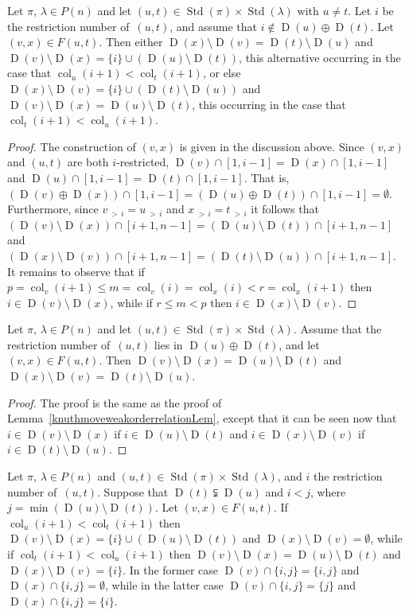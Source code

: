 \documentclass[ALCO,ThmDefs,Unicode,epreuves]{cedram}
\DeclareMathOperator{\col}{col}
\newcommand{\morethan}[2]{#1\,{_{>\,#2}}}
\DeclareMathOperator{\STD}{Std}
\DeclareMathOperator{\D}{D}
\begin{document}
\begin{lemm}\label{knuthmoveweakorderrelationLem}
Let $\pi,\,\lambda\in P(n)$ and let $(u,t)\in\STD(\pi)\times\STD(\lambda)$
with $u\ne t$. Let $i$ be the restriction
number of~$(u,t)$, and assume that $i\notin \D(u)\oplus\D(t)$.
Let $(v,x)\in F(u,t)$.
Then either
$\D(x)\setminus\D(v)=\D(t)\setminus\D(u)$
and
$\D(v)\setminus\D(x)=\{i\}\cup(\D(u)\setminus\D(t))$,
this alternative occurring in the case that
$\col_u(i+1)<\col_t(i+1)$, or else
$\D(x)\setminus\D(v)=\{i\}\cup(\D(t)\setminus\D(u))$
and
$\D(v)\setminus\D(x)=\D(u)\setminus\D(t)$,
this occurring in the case that
$\col_t(i+1)<\col_u(i+1)$.
\end{lemm}

\begin{proof}
The construction of $(v,x)$ is given in the discussion above. Since
$(v,x)$ and $(u,t)$ are both $i$-restricted,
$\D(v)\cap[1,i-1]=\D(x)\cap[1,i-1]$ and $\D(u)\cap[1,i-1]=\D(t)\cap[1,i-1]$.
That is,
$(\D(v)\oplus \D(x))\cap[1,i-1] = (\D(u)\oplus \D(t))\cap[1,i-1] =\emptyset$.
Furthermore, since $\morethan vi= \morethan ui$ and
$\morethan xi= \morethan ti$ it follows that
$(\D(v)\setminus\D(x))\cap[i+1,n-1]=(\D(u)\setminus\D(t))\cap[i+1,n-1]$ and
$(\D(x)\setminus\D(v))\cap[i+1,n-1]=(\D(t)\setminus\D(u))\cap[i+1,n-1]$.
It remains to observe that if
$p=\col_v(i+1)\leqslant m=\col_v(i)=\col_x(i)<r=\col_x(i+1)$ then
$i\in\D(v)\setminus\D(x)$, while if
$r\leqslant m<p$ then $i\in\D(x)\setminus\D(v)$.
\end{proof}

\begin{lemm}\label{knuthmoveweakorderrelationLemb}
Let $\pi,\,\lambda\in P(n)$ and let $(u,t)\in\STD(\pi)\times\STD(\lambda)$.
Assume that the restriction number of~$(u,t)$ lies in
$\D(u)\oplus\D(t)$, and let $(v,x)\in F(u,t)$.
Then $\D(v)\setminus\D(x)=\D(u)\setminus\D(t)$ and
$\D(x)\setminus\D(v)=\D(t)\setminus\D(u)$.
\end{lemm}

\begin{proof}
The proof is the same as the proof of Lemma~\ref{knuthmoveweakorderrelationLem}, except
that it can be seen now that
$i\in\D(v)\setminus\D(x)$ if $i\in\D(u)\setminus\D(t)$ and
$i\in\D(x)\setminus\D(v)$ if $i\in\D(t)\setminus\D(u)$.
\end{proof}

\begin{lemm}\label{noname2}
Let $\pi,\,\lambda\in P(n)$ and $(u,t)\in\STD(\pi)\times\STD(\lambda)$,
and $i$ the restriction number of~$(u,t)$.
Suppose that $\D(t)\subsetneqq\D(u)$ and $i<j$, where
$j=\min (\D(u)\setminus\D(t))$. Let $(v,x)\in F(u,t)$.
If $\col_u(i+1)<\col_t(i+1)$ then
$\D(v)\setminus\D(x)=\{i\}\cup(\D(u)\setminus\D(t))$ and
$\D(x)\setminus\D(v)=\emptyset$, while if $\col_t(i+1)<\col_u(i+1)$ then
$\D(v)\setminus\D(x)=\D(u)\setminus\D(t)$ and
$\D(x)\setminus\D(v)=\{i\}$. In the former case $\D(v)\cap\{i,j\}=\{i,j\}$ and
$\D(x)\cap\{i,j\}=\emptyset$, while in the latter case $\D(v)\cap\{i,j\}=\{j\}$ and
$\D(x)\cap\{i,j\}=\{i\}$.
\end{lemm}
\end{document}
